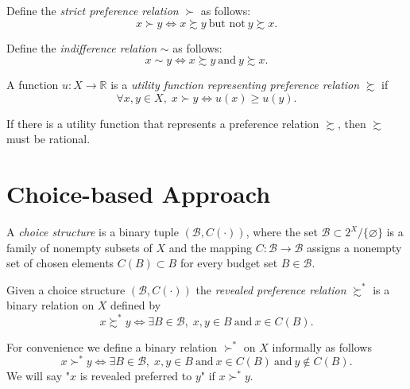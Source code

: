 \documentclass[11pt,fleqn]{book} %
\begin{document}
\begin{definition}
	Define the \emph{strict preference relation} $\succ$ as follows:
	\[	
	x\succ y \Longleftrightarrow x\succsim y \ \text{but not}\  y\succsim x.
	\]
\end{definition}

\begin{definition}
	Define the \emph{indifference relation} $\sim$ as follows:
	\[	
	x\sim y \Longleftrightarrow x\succsim y \ \text{and}\  y\succsim x.
	\]
\end{definition}

\begin{definition}
    A function $u:X\rightarrow\mathbb{R}$ is a \emph{utility function representing preference relation} $\succsim$ if
    \[
    \forall x,y\in X,\;x\succ y\Longleftrightarrow u(x)\ge u(y).
    \]
\end{definition}

\begin{proposition}
	If there is a utility function that represents a preference relation $\succsim$, then $\succsim$ must be rational. 
\end{proposition}


\section{Choice-based Approach}

\begin{definition}
	A \emph{choice structure} is a binary tuple $(\mathcal{B},C(\cdot))$, where the set $\mathcal{B}\subset 2^X\slash \{\varnothing\}$ is a family of nonempty subsets of $X$ and the mapping $C:\mathcal{B}\rightarrow \mathcal{B}$ assigns a nonempty set of chosen elements $C(B)\subset B$ for every budget set $B\in\mathcal{B}$.
\end{definition}

\begin{definition}
	Given a choice structure $(\mathcal{B},C(\cdot))$ the \emph{revealed preference relation} $\succsim^*$ is a binary relation on $X$ defined by
	\[
	x\succsim^*y\Longleftrightarrow \exists B\in\mathcal{B},\;x,y\in B \ \text{and}\  x\in C(B).
	\]
\end{definition}

\begin{remark}
	For convenience we define a binary relation $\succ^*$ on $X$ informally as follows 
	\[
	x\succ^*y\Longleftrightarrow \exists B\in\mathcal{B},\;x,y\in B \ \text{and}\  x\in C(B) \ \text{and}\ y\notin C(B).
	\]
	We will say "$x$ is revealed preferred to $y$" if $x\succ^*y$.
\end{remark}
\end{document}
